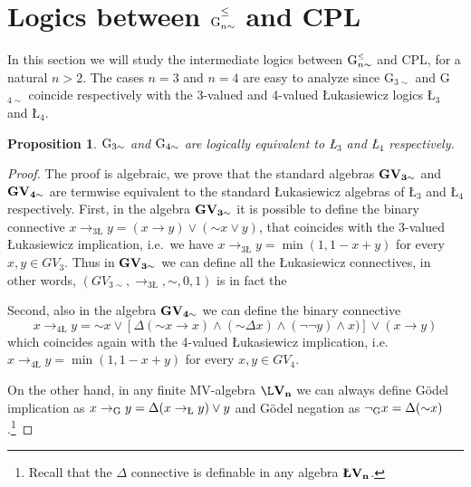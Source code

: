 \documentclass{article}
\newtheorem{proposition}{Proposition}
\theoremstyle{definition}
\newcommand{\ninv}{\mathord{\sim}}
\newcommand{\Gnsimleq}{\mathrm{G}\mystrut^{\text{\tiny $\leq$}}_{n\sim}}
\newcommand\mystrut{\rule{0pt}{7pt}}
\newcommand\mystrutsec{\rule{0pt}{12pt}}
\begin{document}
\section{Logics between $\mathrm{G}\mystrutsec^{\text{\footnotesize $\leq$}}_{n\sim}$ and CPL}
\label{sect-Gn-tilde}


In this section we will study the intermediate logics between $\Gnsimleq$ and CPL, for a natural $n > 2$.
The cases $n=3$ and $n= 4$ are easy to analyze since G$_{3 \sim}$ and G$_{4 \sim}$ coincide respectively with the 3-valued and 4-valued {\L}ukasiewicz logics \L$_{3}$ and \L$_{4}$.

\begin{proposition} \label{3i4}
${\rm G}_{3 \sim}$ and   ${\rm G}_{4 \sim}$ are logically equivalent to \L$_{3}$ and \L$_{4}$ respectively.
\end{proposition}
\begin{proof} The proof is algebraic, we prove that the standard algebras $\bf GV_{3 \sim}$ and $\bf GV_{4 \sim}$ are termwise equivalent to the standard {\L}ukasiewicz algebras of \L$_{3}$ and \L$_{4}$ respectively.
First, in the algebra $\bf GV_{3 \sim}$ it is possible to define the binary connective $x \to_{3\textrm{\L}} y = (x \to y) \lor (\ninv x \lor y)$, that coincides with the 3-valued {\L}ukasiewicz implication, i.e.\ we have $x \to_{3\textrm{\L}} y = \min(1, 1-x+y)$ for every $x, y \in GV_3$. Thus in $\bf GV_{3 \sim}$ we can define all the {\L}ukasiewicz connectives, in other words, $(GV_{3 \sim}, \to_{3\textrm{\L}}, \ninv, 0, 1)$ is in fact the

Second, also in the algebra $\bf GV_{4 \sim}$ we can define the binary connective
$$x  \to_{4\textrm{\L}} y = \ninv x \lor [\Delta(\ninv x \to x) \land (\ninv \Delta x) \land (\neg \neg y) \land x)] \lor (x \to y)$$
which coincides again with the 4-valued {\L}ukasiewicz implication, i.e. $x  \to_{4\textrm{\L}} y = \min(1, 1-x+y)$ for every $x, y \in GV_4$.

On the other hand, in any finite MV-algebra $\bf {\L}V_n$
we can always define G\"odel implication as
$x \to_{\rm{G}} y = \Delta(x \to_{\textrm{\L}} y) \lor y$ and G\"odel negation as $\neg_{\rm{G}} x = \Delta (\ninv x)$.\footnote{Recall that the $\Delta$ connective is definable in any algebra $\bf \textbf{\L} V_n$.}
\end{proof}
\end{document}
